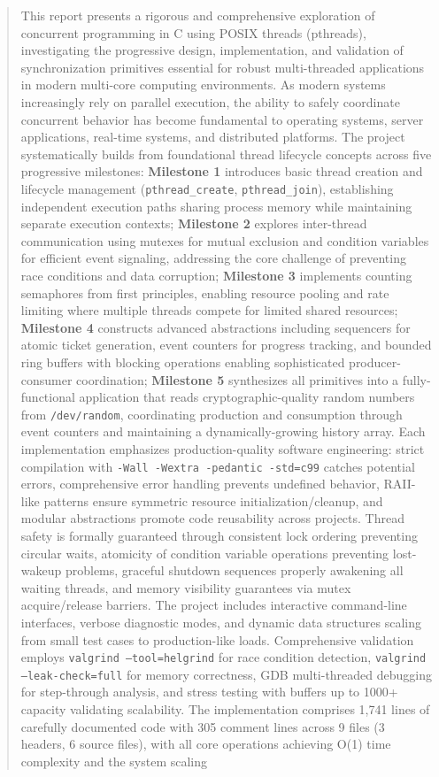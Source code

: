\documentclass[12pt,a4paper]{article}
\begin{document}
\begin{abstract}
This report presents a rigorous and comprehensive exploration of concurrent programming in C using POSIX threads (pthreads), investigating the progressive design, implementation, and validation of synchronization primitives essential for robust multi-threaded applications in modern multi-core computing environments. As modern systems increasingly rely on parallel execution, the ability to safely coordinate concurrent behavior has become fundamental to operating systems, server applications, real-time systems, and distributed platforms. The project systematically builds from foundational thread lifecycle concepts across five progressive milestones: \textbf{Milestone 1} introduces basic thread creation and lifecycle management (\texttt{pthread\_create}, \texttt{pthread\_join}), establishing independent execution paths sharing process memory while maintaining separate execution contexts; \textbf{Milestone 2} explores inter-thread communication using mutexes for mutual exclusion and condition variables for efficient event signaling, addressing the core challenge of preventing race conditions and data corruption; \textbf{Milestone 3} implements counting semaphores from first principles, enabling resource pooling and rate limiting where multiple threads compete for limited shared resources; \textbf{Milestone 4} constructs advanced abstractions including sequencers for atomic ticket generation, event counters for progress tracking, and bounded ring buffers with blocking operations enabling sophisticated producer-consumer coordination; \textbf{Milestone 5} synthesizes all primitives into a fully-functional application that reads cryptographic-quality random numbers from \texttt{/dev/random}, coordinating production and consumption through event counters and maintaining a dynamically-growing history array. Each implementation emphasizes production-quality software engineering: strict compilation with \texttt{-Wall -Wextra -pedantic -std=c99} catches potential errors, comprehensive error handling prevents undefined behavior, RAII-like patterns ensure symmetric resource initialization/cleanup, and modular abstractions promote code reusability across projects. Thread safety is formally guaranteed through consistent lock ordering preventing circular waits, atomicity of condition variable operations preventing lost-wakeup problems, graceful shutdown sequences properly awakening all waiting threads, and memory visibility guarantees via mutex acquire/release barriers. The project includes interactive command-line interfaces, verbose diagnostic modes, and dynamic data structures scaling from small test cases to production-like loads. Comprehensive validation employs \texttt{valgrind --tool=helgrind} for race condition detection, \texttt{valgrind --leak-check=full} for memory correctness, GDB multi-threaded debugging for step-through analysis, and stress testing with buffers up to 1000+ capacity validating scalability. The implementation comprises 1,741 lines of carefully documented code with 305 comment lines across 9 files (3 headers, 6 source files), with all core operations achieving O(1) time complexity and the system scaling 
\end{abstract}
\end{document}
